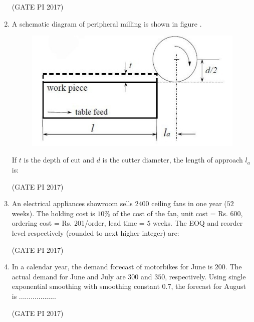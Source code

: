 \documentclass[journal,12pt,onecolumn]{IEEEtran}
\theoremstyle{remark}
\begin{document}
\begin{enumerate}
\hfill (GATE PI 2017)

\item A schematic diagram of peripheral milling is shown in figure .
\begin{figure}[h]
    \centering
    \includegraphics[width=0.4\columnwidth]{fig6.png}
    \caption{}
    \label{fig:placeholder}
\end{figure}


If $t$ is the depth of cut and $d$ is the cutter diameter, the length of approach $l_a$ is:
\begin{enumerate}
\end{enumerate}
\hfill (GATE PI 2017)

\item An electrical appliances showroom sells $2400$ ceiling fans in one year ($52$ weeks).  
The holding cost is $10\%$ of the cost of the fan, unit cost = Rs. 600, ordering cost = Rs. 201/order, lead time = 5 weeks.  
The EOQ and reorder level respectively (rounded to next higher integer) are:
\begin{enumerate}
\end{enumerate}
\hfill (GATE PI 2017)

\item In a calendar year, the demand forecast of motorbikes for June is $200$.  
The actual demand for June and July are $300$ and $350$, respectively.  
Using single exponential smoothing with smoothing constant $0.7$, the forecast for August is ...................

\hfill (GATE PI 2017)


\end{enumerate}
\end{document}
